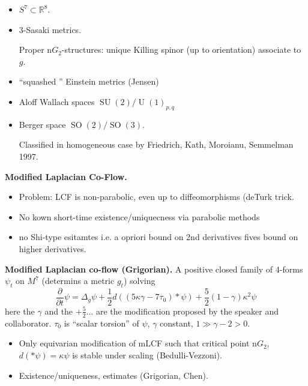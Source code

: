 \begin{example}[G2 structures]
\label{example-g2-structures}
\begin{itemize}
\item $S^7 \subset \mathbb{R}^8$.
\item 3-Sasaki metrics.

Proper n$G_2$-structures: unique Killing
spinor (up to orientation) associate to $g$.

\item ``squashed '' Einstein metrics
(Jensen)
\item Aloff Wallach spaces
$\operatorname{SU}(2)/\operatorname{U}(1)_{p,q}$

\item Berger space
$\operatorname{SO}(2)/\operatorname{SO}(3)$.

Classified in homogeneous case by Friedrich,
Kath, Moroianu, Semmelman 1997.
\end{itemize}
\end{example}

\medskip\noindent
{\bf Modified Laplacian Co-Flow.}
\begin{itemize}
\item Problem: LCF is non-parabolic, even up
to diffeomorphisms (deTurk trick.
\item No kown short-time
existence/uniquecness via parabolic methods
\item no Shi-type esitamtes i.e. a opriori
bound on 2nd derivatives fives bound on
higher derivatives.
\end{itemize}

\noindent
{\bf Modified Laplacian co-flow (Grigorian).} 
A positive closed family of 4-forms $\psi_t$
on $M^7$ (determins a metric $g_t$) solving
$$
\frac{\partial }{\partial t}\psi
=
\Delta_g \psi + \frac{1}{2}d
((5 \kappa \gamma - 7\tau_0) * \psi)
+ \frac{5}{2}(1-\gamma)\kappa^2\psi
$$
here the $\gamma$ and the $+\frac{5}{2}…$
are the modification proposed by the speaker
and collaborator. $\tau_0$ is ``scalar
torsion'' of $\psi$, $\gamma$ constant,
$1\gg  \gamma - 2>0$.

\begin{itemize}
\item Only equivarian modification of mLCF
such that critical point n$G_2$, $d(*
\psi)=\kappa \psi$ is stable under scaling
(Bedulli-Vezzoni).
\item Existence/uniqueness, estimates
(Grigorian, Chen).
\end{itemize}

